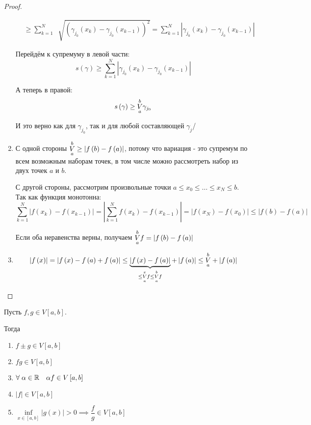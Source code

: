 \documentclass[../main.tex]{subfiles}
\begin{document}
\begin{proof}
\begin{enumerate}
\begin{equation*}
\begin{aligned}
                &\geq \sum\limits_{ k=1}^{ N} \;\sqrt[]{ \left( \gamma _{j_0} \left( x_k\right) - \gamma _{j_0} \left( x_{k-1}\right)\right)^2}= \sum\limits_{ k=1}^{ N} \left| \gamma _{j_0} \left( x_k\right)- \gamma _{j_0} \left( x_{k-1}\right)\right|
            \end{aligned}
        \end{equation*}
        \par Перейдём к супремуму в левой части:
        \[ s\left( \gamma \right) \geq \sum\limits_{ k=1}^{ N} \left| \gamma _{j_0} \left( x_k\right)- \gamma _{j_0} \left( x_{k-1}\right)\right|\]
        \par А теперь в правой: 
        \[ s\left( \gamma \right) \geq \underset{ a}{\overset{ b}{V}} \gamma _{j_0}\]
        \par И это верно как для \( \gamma _{j_0}\), так и для любой составляющей \( \gamma _{j}\)/ 
        \item С одной стороны \( \underset{ a}{\overset{ b}{V}} \geq \left| f\left( b\right)-f \left( a\right)\right|\), потому что вариация - это супремум по всем возможным наборам точек, в том числе можно рассмотреть набор из двух точек \( a\) и \( b\). 
        \par С другой стороны, рассмотрим произвольные точки \( a \leq x_0 \leq \ldots \leq x_N \leq b\). Так как функция монотонна:
        \[ \sum\limits_{ k=1}^{ N} \left| f\left( x_k\right)- f\left( x_{k-1}\right)\right|=\left| \sum\limits_{ k=1}^{ N} f\left( x_k\right)-f \left( x_{k-1}\right)\right|=\left| f\left( x_N\right)-f\left( x_0\right)\right| \leq \left| f\left( b\right)-f\left( a\right)\right|\]
        \par Если оба неравенства верны, получаем \( \underset{ a}{\overset{ b}{V}} f=\left| f\left( b\right)-f\left( a\right)\right|\)
        \item \[ \left| f\left( x\right)\right| = \left| f\left( x\right)-f\left( a\right)+f\left( a\right)\right| \leq \underbrace{\left| f\left( x\right)-f\left( a\right)\right|}_{ \leq \underset{ a}{\overset{ x}{V}} f \leq \underset{ a}{\overset{ b}{V}} f} + \left| f\left( a\right)\right| \leq \underset{ a}{\overset{ b}{V}} + \left| f\left( a\right)\right|\]
    \end{enumerate}
\end{proof}

\begin{thm}
    Пусть \( f,g \in V\left[ a,b\right]\). 
    
    Тогда
    \begin{enumerate}
        \item \( f\pm g \in V\left[ a,b\right]\)
        \item \( fg \in V\left[ a,b\right]\)
        \item \( \forall \; \alpha \in \mathbb{R}\quad \alpha f \in V\left[ a,b\right]\)
        \item \( \left| f\right| \in V\left[ a,b\right]\) 
        \item \( \inf\limits_{x \in \left[ a,b\right]} \left| g \left( x\right)\right|>0 \implies \dfrac{ f}{ g} \in V\left[ a,b\right]\)
    \end{enumerate}
\end{thm}
\end{document}
